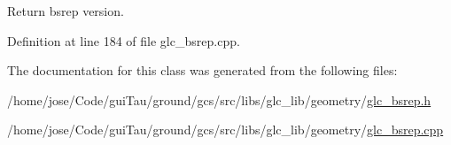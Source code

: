 Return bsrep version. 



Definition at line 184 of file glc\-\_\-bsrep.\-cpp.



The documentation for this class was generated from the following files\-:\begin{DoxyCompactItemize}
\item 
/home/jose/\-Code/gui\-Tau/ground/gcs/src/libs/glc\-\_\-lib/geometry/\hyperlink{glc__bsrep_8h}{glc\-\_\-bsrep.\-h}\item 
/home/jose/\-Code/gui\-Tau/ground/gcs/src/libs/glc\-\_\-lib/geometry/\hyperlink{glc__bsrep_8cpp}{glc\-\_\-bsrep.\-cpp}\end{DoxyCompactItemize}
